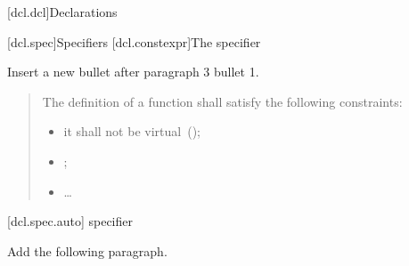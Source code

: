 
[dcl.dcl]{Declarations}

[dcl.spec]{Specifiers}
\setcounter{section}{1}
\setcounter{subsection}{4}
[dcl.constexpr]{The  specifier}%

Insert a new bullet after paragraph 3 bullet 1.


\begin{quote}
  \setcounter{Paras}{2}
\pnum
{}
The definition of a  function shall satisfy the following
constraints:

\begin{itemize}
  \item it shall not be virtual~();
  \item {};
  \item \ldots
\end{itemize}
\end{quote}

%
%  
%      

\setcounter{section}{1}
\setcounter{subsection}{6}
\setcounter{subsubsection}{3}
[dcl.spec.auto]{ specifier}

Add the following paragraph.

